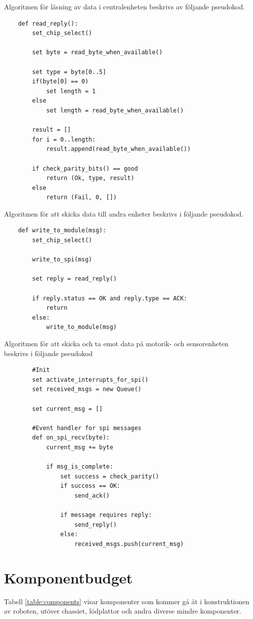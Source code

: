 \documentclass[a4paper,titlepage,12pt]{article}
\begin{document}
	\newpage
	Algoritmen för läsning av data i centralenheten beskrivs av följande pseudokod.


	\begin{lstlisting}
	def read_reply():
		set_chip_select()

		set byte = read_byte_when_available()

		set type = byte[0..5]
		if(byte[0] == 0)
			set length = 1
		else
			set length = read_byte_when_available()
		
		result = []
		for i = 0..length:
			result.append(read_byte_when_available())

		if check_parity_bits() == good
			return (Ok, type, result)
		else
			return (Fail, 0, [])
	\end{lstlisting}

	Algoritmen för att skicka data till andra enheter beskrivs i följande pseudokod.

	\begin{lstlisting}
	def write_to_module(msg):
		set_chip_select()

		write_to_spi(msg)

		set reply = read_reply()

		if reply.status == OK and reply.type == ACK:
			return
		else:
			write_to_module(msg)
	\end{lstlisting}


	\newpage
	Algoritmen för att skicka och ta emot data på motorik- och sensorenheten beskrivs
	i följande pseudokod

	\begin{lstlisting}
		#Init
		set activate_interrupts_for_spi()
		set received_msgs = new Queue()

		set current_msg = []

		#Event handler for spi messages
		def on_spi_recv(byte):
			current_msg += byte

			if msg_is_complete:
				set success = check_parity()
				if success == OK:
					send_ack()
				
				if message requires reply:
					send_reply()
				else:
					received_msgs.push(current_msg)
	\end{lstlisting}

	
	\section{Komponentbudget}

    Tabell \ref{table:components} visar komponenter som kommer gå åt i
    konstruktionen av roboten, utöver chassiet, lödplattor och andra diverse
    mindre komponenter.
\end{document}
